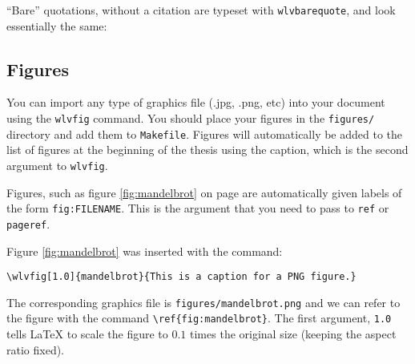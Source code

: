 
``Bare'' quotations, without a citation are typeset with
\verb!wlvbarequote!, and look essentially the same:



\subsection{Figures}


You can import any type of graphics file (.jpg, .png, etc) into your
document using the \verb!wlvfig! command. You should place your
figures in the \verb!figures/! directory and add them to
\verb!Makefile!. Figures will automatically be added to the list of
figures at the beginning of the thesis using the caption, which is the
second argument to \verb!wlvfig!.


Figures, such as figure \ref{fig:mandelbrot} on page
\pageref{fig:mandelbrot} are automatically given labels of the form
\verb!fig:FILENAME!. This is the argument that you need to pass to
\verb!ref! or \verb!pageref!. 


Figure \ref{fig:mandelbrot} was inserted with the command:
\begin{verbatim}
\wlvfig[1.0]{mandelbrot}{This is a caption for a PNG figure.}
\end{verbatim}

The corresponding graphics file is \verb!figures/mandelbrot.png! and
we can refer to the figure with the command
\verb!\ref{fig:mandelbrot}!. The first argument, \verb!1.0! tells
\LaTeX{} to scale the figure to $0.1$ times the original size (keeping
the aspect ratio fixed).


